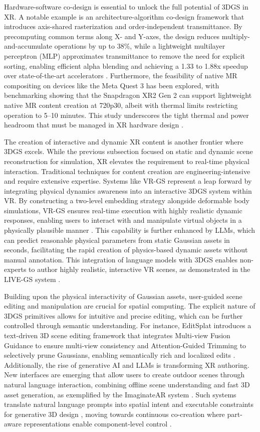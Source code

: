 \documentclass[11pt]{article}
\begin{document}
Hardware-software co-design is essential to unlock the full potential of 3DGS in XR. A notable example is an architecture-algorithm co-design framework that introduces axis-shared rasterization and order-independent transmittance. By precomputing common terms along X- and Y-axes, the design reduces multiply-and-accumulate operations by up to 38\%, while a lightweight multilayer perceptron (MLP) approximates transmittance to remove the need for explicit sorting, enabling efficient alpha blending and achieving a 1.33 to 1.88x speedup over state-of-the-art accelerators \cite{ref111}. Furthermore, the feasibility of native MR compositing on devices like the Meta Quest 3 has been explored, with benchmarking showing that the Snapdragon XR2 Gen 2 can support lightweight native MR content creation at 720p30, albeit with thermal limits restricting operation to 5--10 minutes. This study underscores the tight thermal and power headroom that must be managed in XR hardware design \cite{ref678}.

The creation of interactive and dynamic XR content is another frontier where 3DGS excels. While the previous subsection focused on static and dynamic scene reconstruction for simulation, XR elevates the requirement to real-time physical interaction. Traditional techniques for content creation are engineering-intensive and require extensive expertise. Systems like VR-GS represent a leap forward by integrating physical dynamics awareness into an interactive 3DGS system within VR. By constructing a two-level embedding strategy alongside deformable body simulations, VR-GS ensures real-time execution with highly realistic dynamic responses, enabling users to interact with and manipulate virtual objects in a physically plausible manner \cite{ref679}. This capability is further enhanced by LLMs, which can predict reasonable physical parameters from static Gaussian assets in seconds, facilitating the rapid creation of physics-based dynamic assets without manual annotation. This integration of language models with 3DGS enables non-experts to author highly realistic, interactive VR scenes, as demonstrated in the LIVE-GS system \cite{ref680}.

Building upon the physical interactivity of Gaussian assets, user-guided scene editing and manipulation are crucial for spatial computing. The explicit nature of 3DGS primitives allows for intuitive and precise editing, which can be further controlled through semantic understanding. For instance, EditSplat introduces a text-driven 3D scene editing framework that integrates Multi-view Fusion Guidance to ensure multi-view consistency and Attention-Guided Trimming to selectively prune Gaussians, enabling semantically rich and localized edits \cite{ref538}. Additionally, the rise of generative AI and LLMs is transforming XR authoring. New interfaces are emerging that allow users to create outdoor scenes through natural language interaction, combining offline scene understanding and fast 3D asset generation, as exemplified by the ImaginateAR system \cite{ref681}. Such systems translate natural language prompts into spatial intent and executable constraints for generative 3D design \cite{ref682}, moving towards continuous co-creation where part-aware representations enable component-level control \cite{ref683}.
\end{document}
